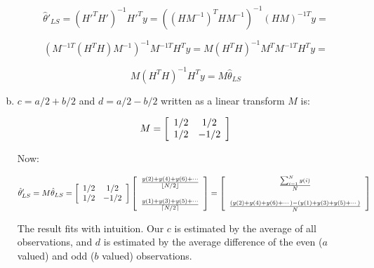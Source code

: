 \documentclass{article}
\begin{document}
\begin{enumerate}[(a)]
\[
\hat{\theta}'_{LS} = (H'^TH')^{-1}H'^Ty = ((HM^{-1})^{T} HM^{-1})^{-1}(HM)^{-1T}y =
\]

\[
(M^{-1T} (H^T H) M^{-1})^{-1}M^{-1T}H^Ty = 
M (H^T H)^{-1} M^T M^{-1T} H^T y =
\]

\[
M (H^T H)^{-1} H^T y = M \hat{\theta}_{LS}
\]

\vspace{2em}

\item
$c = a/2 + b/2$ and $d = a/2 - b/2$ written as a linear transform $M$ is:

\[
M = \left[ \begin{array}{c c}
1/2 & 1/2\\
1/2 & -1/2\\
\end{array} \right]
\]

Now:

\[
\hat{\theta}'_{LS} = M\hat{\theta}_{LS} = 
\left[ \begin{array}{c c}
1/2 & 1/2\\
1/2 & -1/2\\
\end{array} \right]
\left[ \begin{array}{c}
\frac{y(2) + y(4) + y(6) + \cdots}{\lfloor N/2 \rfloor} \\
\\
\frac{y(1) + y(3) + y(5) + \cdots}{\lceil N/2 \rceil} \\
\end{array} \right] =
\left[ \begin{array}{c c}
\frac{\sum_{i=1}^{N} y(i)}{N}\\
\\
\frac{(y(2) + y(4) + y(6) + \cdots) - (y(1) + y(3) + y(5) + \cdots)}{N}\\
\end{array} \right]
\]

The result fits with intuition. Our $c$ is estimated by the average of all
observations, and $d$ is estimated by the average difference of the even 
($a$ valued) and odd ($b$ valued) observations.

\end{enumerate}
\end{document}
